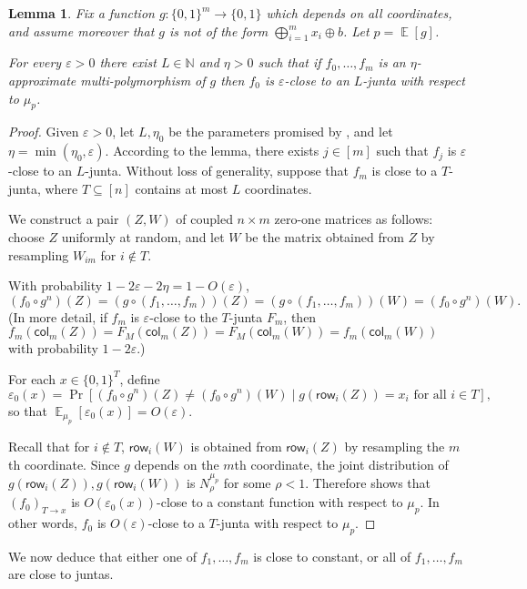 \documentclass{article}
\newtheorem{lemma}[theorem]{Lemma}
\theoremstyle{definition}
\theoremstyle{remark}
\providecommand{\row}{\mathsf{row}}
\providecommand{\col}{\mathsf{col}}
\providecommand{\h}{g}
\DeclareMathOperator*{\E}{\mathbb{E}}
\newcommand\eps{\varepsilon}
\renewcommand\epsilon{\eps}
\begin{document}
\begin{lemma} \label{lem:f-junta-multi-f0}
Fix a function $g\colon \{0,1\}^m \to \{0,1\}$ which depends on all coordinates, and assume moreover that $g$ is not of the form $\bigoplus_{i=1}^m x_i \oplus b$. Let $p = \E[g]$.

For every $\epsilon > 0$ there exist $L \in \mathbb{N}$ and $\eta > 0$ such that if $f_0,\ldots,f_m$ is an $\eta$-approximate multi-polymorphism of $g$ then $f_0$ is $\epsilon$-close to an $L$-junta with respect to $\mu_p$.
\end{lemma}
\begin{proof}
Given $\epsilon > 0$, let $L,\eta_0$ be the parameters promised by , and let $\eta = \min(\eta_0,\epsilon)$. According to the lemma, there exists $j \in [m]$ such that $f_j$ is $\epsilon$-close to an $L$-junta. Without loss of generality, suppose that $f_m$ is close to a $T$-junta, where $T \subseteq [n]$ contains at most $L$ coordinates.

We construct a pair $(Z,W)$ of coupled $n \times m$ zero-one matrices as follows: choose $Z$ uniformly at random, and let $W$ be the matrix obtained from $Z$ by resampling $W_{im}$ for $i \notin T$.

With probability $1 - 2\epsilon - 2\eta = 1 - O(\epsilon)$,
\[
 (f_0 \circ g^n)(Z) = (\h \circ (f_1,\ldots,f_m))(Z) = (\h \circ (f_1,\ldots,f_m))(W) = (f_0 \circ g^n)(W).
\]
(In more detail, if $f_m$ is $\epsilon$-close to the $T$-junta $F_m$, then $f_m(\col_m(Z)) = F_M(\col_m(Z)) = F_M(\col_m(W)) = f_m(\col_m(W))$ with probability $1 - 2\epsilon$.)

For each $x \in \{0,1\}^T$, define
\[
 \epsilon_0(x) = \Pr[(f_0 \circ g^n)(Z) \neq (f_0 \circ g^n)(W) \mid g(\row_i(Z)) = x_i \text{ for all } i \in T],
\]
so that $\E_{\mu_p}[\epsilon_0(x)] = O(\epsilon)$.

Recall that for $i \notin T$, $\row_i(W)$ is obtained from $\row_i(Z)$ by resampling the $m$th coordinate. Since $g$ depends on the $m$th coordinate, the joint distribution of $g(\row_i(Z)),g(\row_i(W))$ is $N_\rho^{\mu_p}$ for some $\rho < 1$. Therefore  shows that $(f_0)_{T \to x}$ is $O(\epsilon_0(x))$-close to a constant function with respect to $\mu_p$. In other words, $f_0$ is $O(\epsilon)$-close to a $T$-junta with respect to $\mu_p$.
\end{proof}

We now deduce that either one of $f_1,\ldots,f_m$ is close to constant, or all of $f_1,\ldots,f_m$ are close to juntas.
\end{document}
